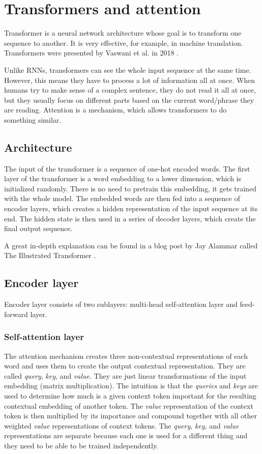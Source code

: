\documentclass[
  printed, %
  color,   %
  table,   %
  oneside, %
  lof,     %
  lot,     %
]{fithesis3}
\begin{document}
\section{Transformers and attention}
\label{sec:transformer}
Transformer is a neural network architecture whose goal is to transform one sequence to another. It is very effective, for example, in machine translation. Transformers were presented by Vaswani et al. in 2018 \cite{attentionisall}.

Unlike RNNs, transformers can see the whole input sequence at the same time. However, this means they have to process a lot of information all at once. When humans try to make sense of a complex sentence, they do not read it all at once, but they usually focus on different parts based on the current word/phrase they are reading. Attention is a mechanism, which allows transformers to do something similar.

\subsection{Architecture}

The input of the transformer is a sequence of one-hot encoded words. The first layer of the transformer is a word embedding to a lower dimension, which is initialized randomly. There is no need to pretrain this embedding, it gets trained with the whole model. 
The embedded words are then fed into a sequence of encoder layers, which creates a hidden representation of the input sequence at its end. The hidden state is then used in a series of decoder layers, which create the final output sequence.

A great in-depth explanation can be found in a blog post by Jay Alammar called The Illustrated Transformer  \parencite{ilustrtran}.

\subsection{Encoder layer}
\label{sec:encoder}
Encoder layer consists of two sublayers: multi-head self-attention layer and feed-forward layer.

\subsubsection{Self-attention layer}

The attention mechanism creates three non-contextual representations of each word and uses them to create the output contextual representation. They are called \textit{query}, \textit{key}, and \textit{value}. They are just linear transformations of the input embedding (matrix multiplication). The intuition is that the \textit{queries} and \textit{keys} are used to determine how much is a given context token important for the resulting contextual embedding of another token. The \textit{value} representation of the context token is then multiplied by its importance and compound together with all other weighted \textit{value} representations of context tokens. The \textit{query}, \textit{key}, and \textit{value} representations are separate because each one is used for a different thing and they need to be able to be trained independently. 
\end{document}
